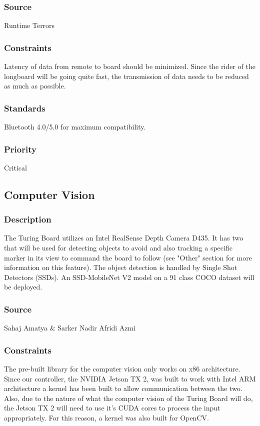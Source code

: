 \subsubsection{Source}
Runtime Terrors
\subsubsection{Constraints}
Latency of data from remote to board should be minimized. Since the rider of the longboard will be going quite fast, the transmission of data needs to be reduced as much as possible. 
\subsubsection{Standards}
Bluetooth 4.0/5.0 for maximum compatibility.
\subsubsection{Priority}
Critical

\subsection{Computer Vision}
\subsubsection{Description}
The Turing Board utilizes an Intel RealSense Depth Camera D435. It has two that will be used for detecting objects to avoid and also tracking a specific marker in its view to command the board to follow (see "Other" section for more information on this feature). The object detection is handled by Single Shot Detectors (SSDs). An SSD-MobileNet V2 model on a 91 class COCO dataset will be deployed.
\subsubsection{Source}
Sahaj Amatya & Sarker Nadir Afridi Azmi
\subsubsection{Constraints}
The pre-built library for the computer vision only works on x86 architecture. Since our controller, the NVIDIA Jetson TX 2, was built to work with Intel ARM architecture a kernel has been built to allow communication between the two.
Also, due to the nature of what the computer vision of the Turing Board will do, the Jetson TX 2 will need to use it's CUDA cores to process the input appropriately. For this reason, a kernel was also built for OpenCV.

